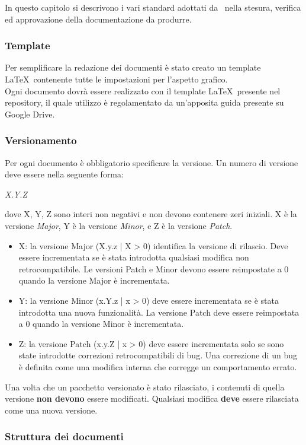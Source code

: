 In questo capitolo si descrivono i vari standard adottati da \GRUPPO\ nella stesura, verifica ed approvazione della documentazione da produrre.
\subsubsection{Template}
Per semplificare la redazione dei documenti è stato creato un \gls{template} \LaTeX\ contenente tutte le impostazioni per l'aspetto grafico. \\
Ogni documento dovrà essere realizzato con il \gls{template} \LaTeX\ presente nel \gls{repository}, il quale utilizzo è regolamentato da un'apposita guida presente su \gls{Google Drive}.
\subsubsection{Versionamento}
Per ogni documento è obbligatorio specificare la versione. Un numero di versione deve essere nella seguente forma:
\begin{center}
	\emph{X.Y.Z}
\end{center}
dove X, Y, Z sono interi non negativi e non devono contenere zeri iniziali. X è la versione \textit{Major}, Y è la versione \textit{Minor}, e Z è la versione \textit{Patch}.
\begin{itemize}
	\item X: la versione Major (X.y.z | X > 0) identifica la versione di rilascio. Deve essere incrementata se è stata introdotta qualsiasi modifica non retrocompatibile. Le versioni Patch e Minor devono essere reimpostate a 0 quando la versione Major è incrementata. 
	\item Y: la versione Minor (x.Y.z | x > 0) deve essere incrementata se è stata introdotta una nuova funzionalità. La versione Patch deve essere reimpostata a 0 quando la versione Minor è incrementata.
	\item Z: la versione Patch (x.y.Z | x > 0) deve essere incrementata solo se sono state introdotte correzioni retrocompatibili di bug. Una correzione di un bug è definita come una modifica interna che corregge un comportamento errato.
\end{itemize}
Una volta che un pacchetto versionato è stato rilasciato, i contenuti di quella versione \textbf{non devono} essere modificati. Qualsiasi modifica \textbf{deve} essere rilasciata come una nuova versione.

\subsubsection{Struttura dei documenti}
